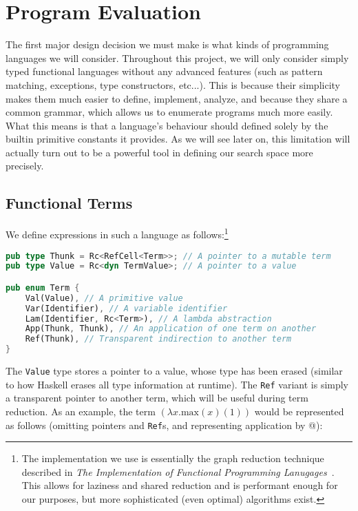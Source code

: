 \section{Program Evaluation}

The first major design decision we must make is what kinds of programming languages we will consider. Throughout this project, we will only consider simply typed functional languages without any advanced features (such as pattern matching, exceptions, type constructors, etc...). This is because their simplicity makes them much easier to define, implement, analyze, and because they share a common grammar, which allows us to enumerate programs much more easily. What this means is that a language's behaviour should defined solely by the builtin primitive constants it provides. As we will see later on, this limitation will actually turn out to be a powerful tool in defining our search space more precisely.

\subsection{Functional Terms}

We define expressions in such a language as follows:\footnote{ The implementation we use is essentially the graph reduction technique described in \textit{The Implementation of Functional Programming Lanugages}~\cite{SLPJ}. This allows for laziness and shared reduction and is performant enough for our purposes, but more sophisticated (even optimal) algorithms exist. } 

\begin{lstlisting}[language=rust]
pub type Thunk = Rc<RefCell<Term>>; // A pointer to a mutable term
pub type Value = Rc<dyn TermValue>; // A pointer to a value

pub enum Term {
    Val(Value), // A primitive value
    Var(Identifier), // A variable identifier
    Lam(Identifier, Rc<Term>), // A lambda abstraction 
    App(Thunk, Thunk), // An application of one term on another
    Ref(Thunk), // Transparent indirection to another term 
}
\end{lstlisting}

The \texttt{Value} type stores a pointer to a value, whose type has been erased (similar to how Haskell erases all type information at runtime). The \texttt{Ref} variant is simply a transparent pointer to another term, which will be useful during term reduction. As an example, the term $(\lambda x.\mathrm{max}(x)(1))$ would be represented as follows (omitting pointers and \texttt{Ref}s, and representing application by @):

